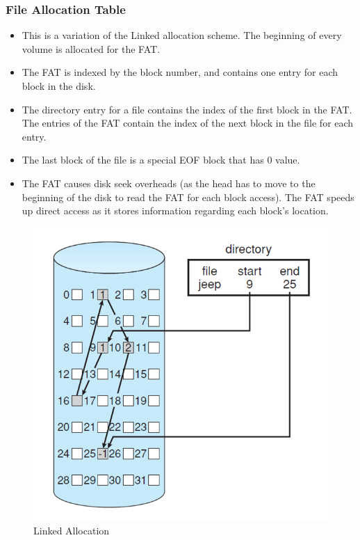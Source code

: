 \documentclass{article}
\theoremstyle{plain}
\theoremstyle{definition}
\begin{document}
\subsubsection{File Allocation Table}
\begin{itemize}
    \item This is a variation of the Linked allocation scheme. The beginning of every volume is allocated for the FAT. 
    
    \item The FAT is indexed by the block number, and contains one entry for each block in the disk. 
    
    \item The directory entry for a file contains the index of the first block in the FAT. The entries of the FAT contain the index of the next block in the file for each entry. 
    
    \item The last block of the file is a special EOF block that has 0 value. 
    
    \item The FAT causes disk seek overheads (as the head has to move to the beginning of the disk to read the FAT for each block access). The FAT speeds up direct access as it stores information regarding each block's location. 
\end{itemize}

\begin{figure}[!h]
    \centering
    \includegraphics[scale=0.5]{os9.png}
    \caption{Linked Allocation}
    \label{fig:my_label_20}
\end{figure}
\end{document}
